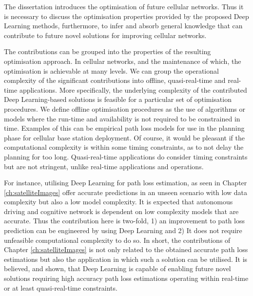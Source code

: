 The dissertation introduces the optimisation of future cellular networks. Thus it is necessary to discuss the optimisation properties provided by the proposed Deep Learning methods, furthermore, to infer and absorb general knowledge that can contribute to future novel solutions for improving cellular networks.

The contributions can be grouped into the properties of the resulting optimisation approach. In cellular networks, and the maintenance of which, the optimisation is achievable at many levels. We can group the operational complexity of the significant contributions into offline, quasi-real-time and real-time applications. More specifically, the underlying complexity of the contributed Deep Learning-based solutions is feasible for a particular set of optimisation procedures. We define offline optimisation procedures as the use of algorithms or models where the run-time and availability is not required to be constrained in time. Examples of this can be empirical path loss models for use in the planning phase for cellular base station deployment. Of course, it would be pleasant if the computational complexity is within some timing constraints, as to not delay the planning for too long. Quasi-real-time applications do consider timing constraints but are not stringent, unlike real-time applications and operations. 

For instance, utilising Deep Learning for path loss estimation, as seen in Chapter \ref{ch:satelliteImages} offer accurate predictions in an unseen scenario with low data complexity but also a low model complexity. It is expected that autonomous driving and cognitive network is dependent on low complexity models that are accurate. Thus the contribution here is two-fold, 1) an improvement to path loss prediction can be engineered by using Deep Learning and 2) It does not require unfeasible computational complexity to do so. In short, the contributions of Chapter \ref{ch:satelliteImages} is not only related to the obtained accurate path loss estimations but also the application in which such a solution can be utilised. It is believed, and shown, that Deep Learning is capable of enabling future novel solutions requiring high accuracy path loss estimations operating within real-time or at least quasi-real-time constraints. 


